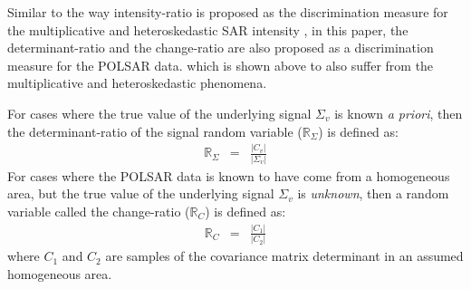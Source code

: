 \documentclass[journal]{IEEEtran}
\begin{document}
Similar to the way intensity-ratio is proposed as the discrimination measure for the multiplicative and heteroskedastic SAR intensity \cite{Rignot_1993_TGRS_896},
in this paper, the determinant-ratio and the change-ratio are also proposed as a discrimination measure for the POLSAR data.
  which is shown above to also suffer from the multiplicative and heteroskedastic phenomena.

For cases where the true value of the underlying signal $\Sigma_v$ is known \textit{a priori},
then the determinant-ratio of the signal random variable ($\mathbb{R}_{\Sigma}$) %
  is defined as:
\begin{eqnarray}
  \mathbb{R}_{\Sigma} &=& \frac{|C_v|}{|\Sigma_v|} \label{eqn:determinant_ratio_observables}%
\end{eqnarray}
For cases where the POLSAR data is known to have come from a homogeneous area, but the true value of the underlying signal $\Sigma_v$ is \textit{unknown},
 then a random variable called the change-ratio ($\mathbb{R}_{C}$)  is defined as:
\begin{eqnarray}
  \mathbb{R}_{C} &=& \frac{|C_1|}{|C_2|} \label{eqn:determinant_ratio_samples_observables}%
\end{eqnarray}
where $C_1$ and $C_2$ are samples of the covariance matrix determinant in an assumed homogeneous area. 

\end{document}
